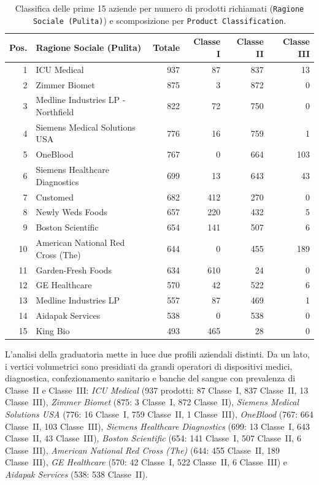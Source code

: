 \begin{table}[htbp]
\centering
\caption{Classifica delle prime 15 aziende per numero di prodotti richiamati (\texttt{Ragione Sociale (Pulita)}) e scomposizione per \texttt{Product Classification}.}
\label{tab:tableau_top15_firms}
\begin{tabularx}{\textwidth}{@{}rXrrrr@{}}
\toprule
\textbf{Pos.} & \textbf{Ragione Sociale (Pulita)} & \textbf{Totale} & \textbf{Classe I} & \textbf{Classe II} & \textbf{Classe III} \\
\midrule
1 & ICU Medical & 937 & 87 & 837 & 13 \\
2 & Zimmer Biomet & 875 & 3 & 872 & 0 \\
3 & Medline Industries LP - Northfield & 822 & 72 & 750 & 0 \\
4 & Siemens Medical Solutions USA & 776 & 16 & 759 & 1 \\
5 & OneBlood & 767 & 0 & 664 & 103 \\
6 & Siemens Healthcare Diagnostics & 699 & 13 & 643 & 43 \\
7 & Customed & 682 & 412 & 270 & 0 \\
8 & Newly Weds Foods & 657 & 220 & 432 & 5 \\
9 & Boston Scientific & 654 & 141 & 507 & 6 \\
10 & American National Red Cross (The) & 644 & 0 & 455 & 189 \\
11 & Garden-Fresh Foods & 634 & 610 & 24 & 0 \\
12 & GE Healthcare & 570 & 42 & 522 & 6 \\
13 & Medline Industries LP & 557 & 87 & 469 & 1 \\
14 & Aidapak Services & 538 & 0 & 538 & 0 \\
15 & King Bio & 493 & 465 & 28 & 0 \\
\bottomrule
\end{tabularx}
\end{table}

L'analisi della graduatoria mette in luce due profili aziendali distinti. Da un lato, i vertici volumetrici sono presidiati da grandi operatori di dispositivi medici, diagnostica, confezionamento sanitario e banche del sangue con prevalenza di Classe~II e Classe~III: \textit{ICU Medical} (937 prodotti: 87 Classe~I, 837 Classe~II, 13 Classe~III), \textit{Zimmer Biomet} (875: 3 Classe~I, 872 Classe~II), \textit{Siemens Medical Solutions USA} (776: 16 Classe~I, 759 Classe~II, 1 Classe~III), \textit{OneBlood} (767: 664 Classe~II, 103 Classe~III), \textit{Siemens Healthcare Diagnostics} (699: 13 Classe~I, 643 Classe~II, 43 Classe~III), \textit{Boston Scientific} (654: 141 Classe~I, 507 Classe~II, 6 Classe~III), \textit{American National Red Cross (The)} (644: 455 Classe~II, 189 Classe~III), \textit{GE Healthcare} (570: 42 Classe~I, 522 Classe~II, 6 Classe~III) e \textit{Aidapak Services} (538: 538 Classe~II).


